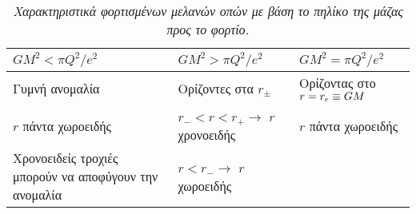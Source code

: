 \begin{table}[t]
    \centering
    \begin{tabular}{|p{4.5cm}|p{4.5cm}|p{4.5cm}|}
            \hline
            $GM^2 < \pi Q^2/e^2$ & $GM^2 > \pi Q^2/e^2$ & $GM^2 = \pi Q^2/e^2$\\
            \hline
            Γυμνή ανομαλία & Ορίζοντες στα $r_{\pm}$ & Ορίζοντας στο $r=r\subscr{e}\equiv GM$\\
            $r$ πάντα χωροειδής & $r_-<r<r_+ \rightarrow$ $r$ χρονοειδής & $r$ πάντα χωροειδής \\
            Χρονοειδείς τροχιές μπορούν να αποφύγουν την ανομαλία & $r<r_-\rightarrow$ $r$ χωροειδής & \\
            \hline
    \end{tabular}
    \caption{\textit{Χαρακτηριστικά φορτισμένων μελανών οπών με βάση το πηλίκο της μάζας προς το φορτίο.}}
    \label{table:mass to charge ratio}
\end{table}

